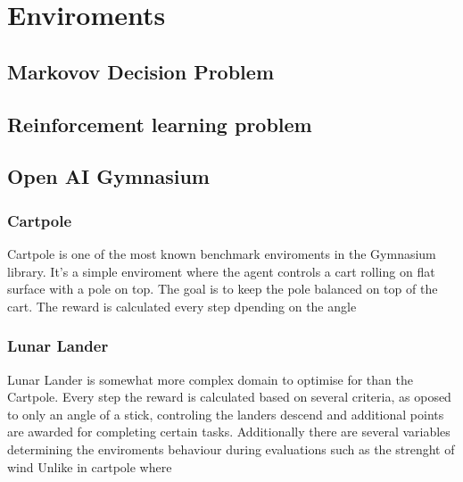 \chapter{Enviroments}

\section{Markovov Decision Problem}
\section{Reinforcement learning problem}
\section{Open AI Gymnasium}

\subsection{Cartpole}
Cartpole is one of the most known benchmark enviroments in the Gymnasium library. It's a simple enviroment where the agent controls a cart rolling on flat surface with a pole on top.
The goal is to keep the pole balanced on top of the cart. The reward is calculated every step dpending on the angle 
\subsection{Lunar Lander}
Lunar Lander is somewhat more complex domain to optimise for than the Cartpole.  
Every step the reward is calculated based on several criteria, as oposed to only an angle of a stick, controling the landers descend and additional points are awarded for completing certain tasks.
Additionally there are several variables determining the enviroments behaviour during evaluations such as the strenght of wind Unlike in cartpole where  